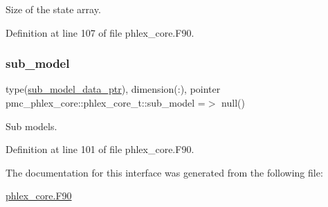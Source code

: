 Size of the state array. 



Definition at line 107 of file phlex\+\_\+core.\+F90.

\mbox{\label{structpmc__phlex__core_1_1phlex__core__t_a4e0081099dd1d59ae0722d60260447b0}} 
\subsubsection{\texorpdfstring{sub\+\_\+model}{sub\_model}}
{\footnotesize\ttfamily type(\mbox{\hyperlink{structpmc__sub__model__data_1_1sub__model__data__ptr}{sub\+\_\+model\+\_\+data\+\_\+ptr}}), dimension(\+:), pointer pmc\+\_\+phlex\+\_\+core\+::phlex\+\_\+core\+\_\+t\+::sub\+\_\+model =$>$ null()\hspace{0.3cm}{\ttfamily [private]}}



Sub models. 



Definition at line 101 of file phlex\+\_\+core.\+F90.



The documentation for this interface was generated from the following file\+:\begin{DoxyCompactItemize}
\item 
\mbox{\hyperlink{phlex__core_8_f90}{phlex\+\_\+core.\+F90}}\end{DoxyCompactItemize}
